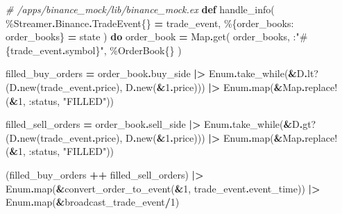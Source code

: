 \documentclass[
  oneside]{book}
\newenvironment{Shaded}{\begin{snugshade}}{\end{snugshade}}
\newcommand{\CommentTok}[1]{\textcolor[rgb]{0.56,0.35,0.01}{\textit{#1}}}
\newcommand{\ConstantTok}[1]{\textcolor[rgb]{0.00,0.00,0.00}{#1}}
\newcommand{\DecValTok}[1]{\textcolor[rgb]{0.00,0.00,0.81}{#1}}
\newcommand{\KeywordTok}[1]{\textcolor[rgb]{0.13,0.29,0.53}{\textbf{#1}}}
\newcommand{\NormalTok}[1]{#1}
\newcommand{\OperatorTok}[1]{\textcolor[rgb]{0.81,0.36,0.00}{\textbf{#1}}}
\newcommand{\OtherTok}[1]{\textcolor[rgb]{0.56,0.35,0.01}{#1}}
\newcommand{\StringTok}[1]{\textcolor[rgb]{0.31,0.60,0.02}{#1}}
\newcommand{\VariableTok}[1]{\textcolor[rgb]{0.00,0.00,0.00}{#1}}
\begin{document}
\begin{Shaded}
\begin{Highlighting}[]
\CommentTok{\# /apps/binance\_mock/lib/binance\_mock.ex}
  \KeywordTok{def}\NormalTok{ handle\_info(}
\NormalTok{        \%}\ConstantTok{Streamer}\OperatorTok{.}\ConstantTok{Binance}\OperatorTok{.}\ConstantTok{TradeEvent}\NormalTok{\{\} }\OperatorTok{=}\NormalTok{ trade\_event,}
\NormalTok{        \%\{}\VariableTok{order\_books:}\NormalTok{ order\_books\} }\OperatorTok{=}\NormalTok{ state}
\NormalTok{      ) }\KeywordTok{do}
\NormalTok{    order\_book }\OperatorTok{=}
      \ConstantTok{Map}\OperatorTok{.}\NormalTok{get(}
\NormalTok{        order\_books,}
\NormalTok{        :}\StringTok{"}\OtherTok{\#\{}\NormalTok{trade\_event}\OperatorTok{.}\NormalTok{symbol}\OtherTok{\}}\StringTok{"}\NormalTok{,}
\NormalTok{        \%}\ConstantTok{OrderBook}\NormalTok{\{\}}
\NormalTok{      )}

\NormalTok{    filled\_buy\_orders }\OperatorTok{=}
\NormalTok{      order\_book}\OperatorTok{.}\NormalTok{buy\_side}
      \OperatorTok{|\textgreater{}} \ConstantTok{Enum}\OperatorTok{.}\NormalTok{take\_while(}\OperatorTok{\&}\NormalTok{D}\OperatorTok{.}\NormalTok{lt?(D}\OperatorTok{.}\NormalTok{new(trade\_event}\OperatorTok{.}\NormalTok{price), D}\OperatorTok{.}\NormalTok{new(}\OperatorTok{\&}\DecValTok{1}\OperatorTok{.}\NormalTok{price)))}
      \OperatorTok{|\textgreater{}} \ConstantTok{Enum}\OperatorTok{.}\NormalTok{map(}\OperatorTok{\&}\ConstantTok{Map}\OperatorTok{.}\NormalTok{replace!(}\OperatorTok{\&}\DecValTok{1}\NormalTok{, }\VariableTok{:status}\NormalTok{, }\StringTok{"FILLED"}\NormalTok{))}

\NormalTok{    filled\_sell\_orders }\OperatorTok{=}
\NormalTok{      order\_book}\OperatorTok{.}\NormalTok{sell\_side}
      \OperatorTok{|\textgreater{}} \ConstantTok{Enum}\OperatorTok{.}\NormalTok{take\_while(}\OperatorTok{\&}\NormalTok{D}\OperatorTok{.}\NormalTok{gt?(D}\OperatorTok{.}\NormalTok{new(trade\_event}\OperatorTok{.}\NormalTok{price), D}\OperatorTok{.}\NormalTok{new(}\OperatorTok{\&}\DecValTok{1}\OperatorTok{.}\NormalTok{price)))}
      \OperatorTok{|\textgreater{}} \ConstantTok{Enum}\OperatorTok{.}\NormalTok{map(}\OperatorTok{\&}\ConstantTok{Map}\OperatorTok{.}\NormalTok{replace!(}\OperatorTok{\&}\DecValTok{1}\NormalTok{, }\VariableTok{:status}\NormalTok{, }\StringTok{"FILLED"}\NormalTok{))}

\NormalTok{    (filled\_buy\_orders }\OperatorTok{++}\NormalTok{ filled\_sell\_orders)}
    \OperatorTok{|\textgreater{}} \ConstantTok{Enum}\OperatorTok{.}\NormalTok{map(}\OperatorTok{\&}\NormalTok{convert\_order\_to\_event(}\OperatorTok{\&}\DecValTok{1}\NormalTok{, trade\_event}\OperatorTok{.}\NormalTok{event\_time))}
    \OperatorTok{|\textgreater{}} \ConstantTok{Enum}\OperatorTok{.}\NormalTok{map(}\OperatorTok{\&}\NormalTok{broadcast\_trade\_event}\OperatorTok{/}\DecValTok{1}\NormalTok{)}


\end{Highlighting}
\end{Shaded}
\end{document}
